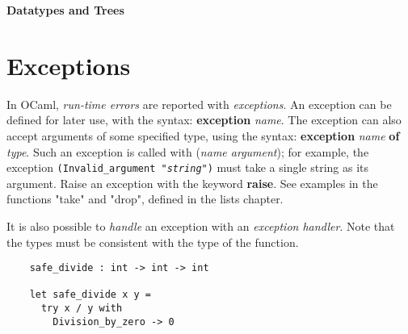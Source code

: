 \documentclass[12pt]{article}
\begin{document}
\begin{center}\LARGE\bf
    Datatypes and Trees
\end{center}

\section{Exceptions}
In OCaml, \textit{run-time errors} are reported with \textit{exceptions}. An exception can be defined
for later use, with the syntax: \textbf{exception} \textit{name}. The exception can also accept arguments
of some specified type, using the syntax: \textbf{exception} \textit{name} \textbf{of} \textit{type}.
Such an exception is called with (\textit{name argument}); for example, the exception \texttt{(Invalid\_argument "\textit{string}")}
must take a single string as its argument. Raise an exception with the keyword \textbf{raise}. See
examples in the functions "take" and "drop", defined in the lists chapter.

It is also possible to \textit{handle} an exception with an \textit{exception handler}. Note that the types must be
consistent with the type of the function.
\begin{lstlisting}
    safe_divide : int -> int -> int

    let safe_divide x y =
      try x / y with
        Division_by_zero -> 0
\end{lstlisting}
\end{document}
